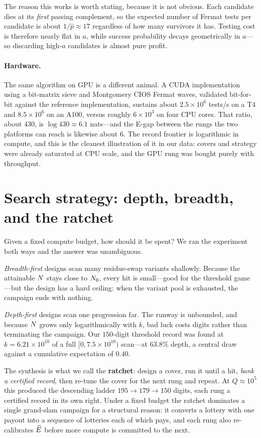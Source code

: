 The reason this works is worth stating, because it is not obvious. Each
candidate dies at its \emph{first} passing complement, so the expected number of
Fermat tests per candidate is about $1/\hat p\approx17$ regardless of how many
survivors it has. Testing cost is therefore nearly flat in $a$, while success
probability decays geometrically in $a$---so discarding high-$a$ candidates is
almost pure profit.

\paragraph{Hardware.} The same algorithm on GPU is a different animal. A CUDA
implementation using a bit-matrix sieve and Montgomery CIOS Fermat waves,
validated bit-for-bit against the reference implementation, sustains about
$2.5\times10^{6}$ tests/s on a T4 and $8.5\times10^{6}$ on an A100, versus
roughly $6\times10^{3}$ on four CPU cores. That ratio, about $430$, is
$\log 430\approx6.1$ nats---and the E-gap between the rungs the two platforms
can reach is likewise about $6$. The record frontier is logarithmic in compute,
and this is the cleanest illustration of it in our data: covers and strategy
were already saturated at CPU scale, and the GPU rung was bought purely with
throughput.

\section{Search strategy: depth, breadth, and the ratchet}\label{sec:ratchet}

Given a fixed compute budget, how should it be spent? We ran the experiment
both ways and the answer was unambiguous.

\emph{Breadth-first} designs scan many residue-swap variants shallowly. Because
the attainable $N$ stays close to $N_0$, every hit is small---good for the
threshold game---but the design has a hard ceiling: when the variant pool is
exhausted, the campaign ends with nothing.

\emph{Depth-first} designs scan one progression far. The runway is unbounded, and
because $N$ grows only logarithmically with $k$, bad luck costs digits rather
than terminating the campaign. Our $150$-digit threshold record was found at
$k=6.21\times10^{10}$ of a full $[0,7.5\times10^{10})$ scan---at $63.8\%$
depth, a central draw against a cumulative expectation of $0.40$.

The synthesis is what we call the \textbf{ratchet}: design a cover, run it until
a hit, \emph{bank a certified record}, then re-tune the cover for the next rung
and repeat. At $Q\approx10^{5}$ this produced the descending ladder
$195\to179\to150$ digits, each rung a certified record in its own right. Under a
fixed budget the ratchet dominates a single grand-slam campaign for a structural
reason: it converts a lottery with one payout into a sequence of lotteries each
of which pays, and each rung also re-calibrates $\widehat{E}$ before more compute is
committed to the next.

